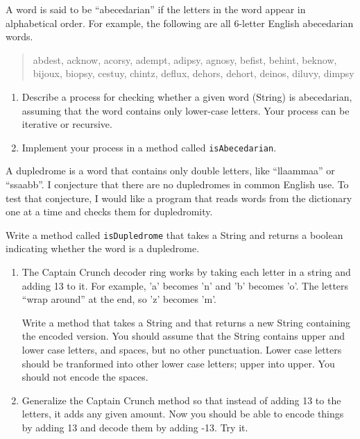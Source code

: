 \begin{exercise}
\label{abecedarian}

A word is said to be ``abecedarian'' if the letters in the
word appear in alphabetical order.  For example, the following
are all 6-letter English abecedarian words.

\begin {quote}
abdest, acknow, acorsy, adempt, adipsy, agnosy, befist, behint,
beknow, bijoux, biopsy, cestuy, chintz, deflux, dehors, dehort,
deinos, diluvy, dimpsy
\end{quote}

\begin{enumerate}

\item Describe a process for checking whether a given word (String)
is abecedarian, assuming that the word contains only lower-case
letters.  Your process can be iterative or recursive.

\item Implement your process in a method called {\tt isAbecedarian}.

\end{enumerate}
\end{exercise}


\begin{exercise}
\label{dupledrome}
A dupledrome is a word that contains only double letters,
like ``llaammaa'' or ``ssaabb''.  I conjecture that there
are no dupledromes in common English use.  To test that
conjecture, I would like a program that reads
words from the dictionary one at a time and checks them for
dupledromity.

Write a method called {\tt isDupledrome} that takes a String
and returns a boolean indicating whether the word is a dupledrome.
\end{exercise}



\begin{exercise}
\begin{enumerate}

\item The Captain Crunch decoder ring works by taking each letter in a
string and adding 13 to it.  For example, 'a' becomes 'n' and 'b'
becomes 'o'.  The letters ``wrap around'' at the end, so 'z' becomes
'm'.

Write a method that takes a String and that returns a new String
containing the encoded version.  You should assume that the String
contains upper and lower case letters, and spaces, but no other
punctuation.  Lower case letters should be tranformed into other lower
case letters; upper into upper.  You should not encode the spaces.

\item Generalize the Captain Crunch method so that instead of adding
13 to the letters, it adds any given amount.  Now you should be able
to encode things by adding 13 and decode them by adding -13.  Try it.

\end{enumerate}
\end{exercise}


